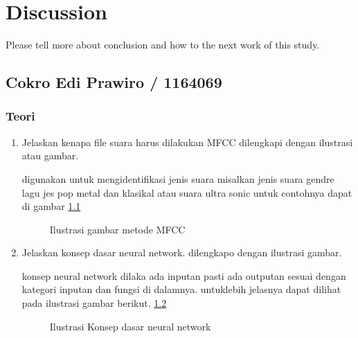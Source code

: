 \chapter{Discussion}
Please tell more about conclusion and how to the next work of this study.

\section{Cokro Edi Prawiro / 1164069}
\subsection{Teori}

\begin{enumerate}

\item Jelaskan kenapa file suara harus dilakukan MFCC dilengkapi dengan ilustrasi atau gambar.\par
digunakan untuk mengidentifikasi jenis suara misalkan jenis suara gendre lagu jes pop metal dan klasikal atau suara ultra sonic untuk contohnya dapat di gambar \ref{c113} 

\begin{figure}[!htbp]
      \caption{Ilustrasi gambar metode MFCC}
      \label{c113}
      \end{figure}

\item Jelaskan konsep dasar neural network. dilengkapo dengan ilustrasi gambar. \par
konsep neural network dilaka ada inputan pasti ada outputan sesuai dengan kategori inputan dan fungsi di dalamnya. untuklebih jelasnya dapat dilihat pada ilustrasi gambar berikut. \ref{c114}

\begin{figure}[!htbp]
      \caption{Ilustrasi Konsep dasar neural network}
      \label{c114}
      \end{figure}


\end{enumerate}
